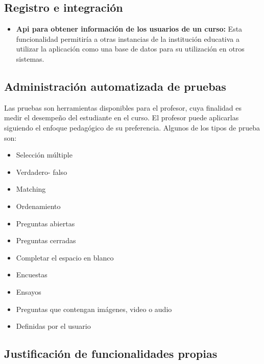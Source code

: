 \subsection{Registro e integración}

\begin{itemize}
\item \textbf{Api para obtener información de los usuarios de un curso:} Esta funcionalidad permitiría a otras instancias de la institución educativa a utilizar la aplicación como una base de datos para su utilización en otros sistemas.
\end{itemize}

\subsection{Administración automatizada de pruebas}

Las pruebas son herramientas disponibles para el profesor, cuya finalidad es medir el desempeño del estudiante en el curso. El profesor puede aplicarlas siguiendo el enfoque pedagógico de su preferencia. Algunos de los tipos de prueba son:
\begin{itemize}
\item Selección múltiple
\item Verdadero- falso
\item Matching
\item Ordenamiento
\item Preguntas abiertas
\item Preguntas cerradas
\item Completar el espacio en blanco
\item Encuestas
\item Ensayos
\item Preguntas que contengan imágenes, video o audio
\item Definidas por el usuario
\end{itemize}


\subsection*{Justificación de funcionalidades propias}

